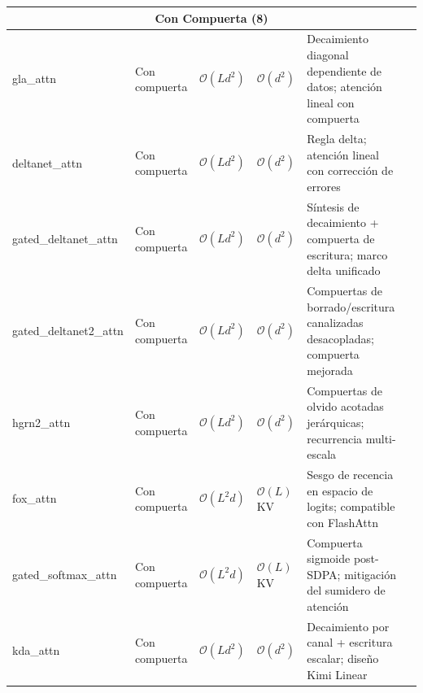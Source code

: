 \begin{longtable}{p{2.0cm}p{1.3cm}p{2.2cm}p{2.2cm}p{4.0cm}p{2.5cm}}
\multicolumn{6}{c}{\textbf{Con Compuerta (8)}} \\
\midrule
gla\_attn & Con compuerta & $\mathcal{O}(L d^2)$ & $\mathcal{O}(d^2)$ & Decaimiento diagonal dependiente de datos; atención lineal con compuerta & \citep{yang_gla_2023} \\
deltanet\_attn & Con compuerta & $\mathcal{O}(L d^2)$ & $\mathcal{O}(d^2)$ & Regla delta; atención lineal con corrección de errores & \citep{yang_deltanet_2024} \\
gated\_deltanet\_attn & Con compuerta & $\mathcal{O}(L d^2)$ & $\mathcal{O}(d^2)$ & Síntesis de decaimiento + compuerta de escritura; marco delta unificado & \citep{yang_gated_deltanet_2024} \\
gated\_deltanet2\_attn & Con compuerta & $\mathcal{O}(L d^2)$ & $\mathcal{O}(d^2)$ & Compuertas de borrado/escritura canalizadas desacopladas; compuerta mejorada & \citep{hatamizadeh_gated_deltanet2_2026} \\
hgrn2\_attn & Con compuerta & $\mathcal{O}(L d^2)$ & $\mathcal{O}(d^2)$ & Compuertas de olvido acotadas jerárquicas; recurrencia multi-escala & \citep{qin_hgrn2_2024} \\
fox\_attn & Con compuerta & $\mathcal{O}(L^2 d)$ & $\mathcal{O}(L)$ KV & Sesgo de recencia en espacio de logits; compatible con FlashAttn & \citep{lin_forgetting_transformer_2025} \\
gated\_softmax\_attn & Con compuerta & $\mathcal{O}(L^2 d)$ & $\mathcal{O}(L)$ KV & Compuerta sigmoide post-SDPA; mitigación del sumidero de atención & \citep{qiu_gated_attention_2025} \\
kda\_attn & Con compuerta & $\mathcal{O}(L d^2)$ & $\mathcal{O}(d^2)$ & Decaimiento por canal + escritura escalar; diseño Kimi Linear & \citep{kimi_kda_2025} \\
\midrule


\end{longtable}
